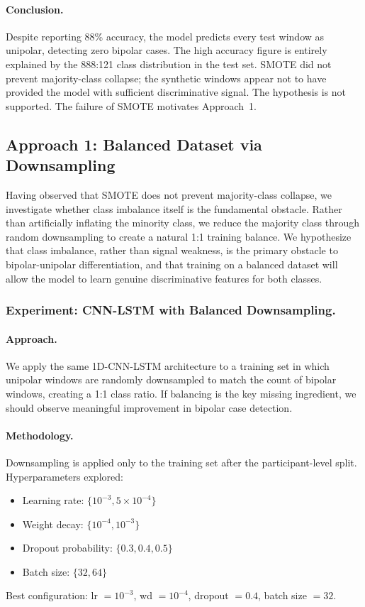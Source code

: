\paragraph{Conclusion.}
Despite reporting 88\% accuracy, the model predicts every test window as unipolar, detecting zero bipolar cases. The high accuracy figure is entirely explained by the 888:121 class distribution in the test set. SMOTE did not prevent majority-class collapse; the synthetic windows appear not to have provided the model with sufficient discriminative signal. The hypothesis is not supported. The failure of SMOTE motivates Approach~1.

\subsection{Approach 1: Balanced Dataset via Downsampling}

Having observed that SMOTE does not prevent majority-class collapse, we investigate whether class imbalance itself is the fundamental obstacle. Rather than artificially inflating the minority class, we reduce the majority class through random downsampling to create a natural 1:1 training balance. We hypothesize that class imbalance, rather than signal weakness, is the primary obstacle to bipolar-unipolar differentiation, and that training on a balanced dataset will allow the model to learn genuine discriminative features for both classes.

\subsubsection{Experiment: CNN-LSTM with Balanced Downsampling.}

\paragraph{Approach.}
We apply the same 1D-CNN-LSTM architecture to a training set in which unipolar windows are randomly downsampled to match the count of bipolar windows, creating a 1:1 class ratio. If balancing is the key missing ingredient, we should observe meaningful improvement in bipolar case detection.

\paragraph{Methodology.}
Downsampling is applied only to the training set after the participant-level split. Hyperparameters explored:
\begin{itemize}[nosep]
  \item Learning rate: $\{10^{-3}, 5 \times 10^{-4}\}$
  \item Weight decay: $\{10^{-4}, 10^{-3}\}$
  \item Dropout probability: $\{0.3, 0.4, 0.5\}$
  \item Batch size: $\{32, 64\}$
\end{itemize}
Best configuration: lr $= 10^{-3}$, wd $= 10^{-4}$, dropout $= 0.4$, batch size $= 32$.

